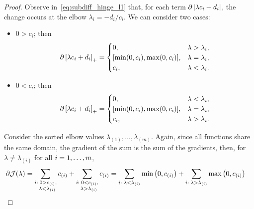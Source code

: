 \begin{proof}
    Observe in~\eqref{eq:subdiff_hinge_l1} that, for each term $\partial \left|\lambda c_i + d_i\right|$, the change occurs at the elbow $\lambda_{i} = - d_ i / c_i$. We can consider two cases:
    \begin{itemize}
        \item $0 > c_i$; then
        \begin{equation}
            \nonumber
            \begin{aligned}
                \partial \left[\lambda c_i + d_i\right]_{+} = 
            \begin{cases}
                0 ,& \lambda > \lambda_i, \\
                [\min(0, c_i), \max(0, c_i)] ,& \lambda = \lambda_i, \\
                {c_i} ,& \lambda < \lambda_i .\\
            \end{cases}
            \end{aligned}
        \end{equation}
        \item $0 < c_i$; then
        \begin{equation}
            \nonumber
            \begin{aligned}
                \partial \left[\lambda c_i + d_i\right]_{+} = 
            \begin{cases}
                0 ,& \lambda < \lambda_i, \\
                [\min(0, c_i), \max(0, c_i)] ,& \lambda = \lambda_i, \\
                {c_i} ,& \lambda > \lambda_i .\\
            \end{cases}
            \end{aligned}
        \end{equation}
    \end{itemize}
    Consider the sorted elbow values $\lambda_{(1)}, \ldots, \lambda_{(m)}$.
    Again, since all functions share the same domain, the gradient of the sum is the sum of the gradients, then, for $\lambda \neq \lambda_{(i)}$ for all $i=1,\ldots,m$,
    \begin{equation}\nonumber
        \begin{aligned}
            \partial \mathcal{J}(\lambda) &=  \sum_{\substack{i:\; 0 > c_{(i)},\\ \;\; \lambda < \lambda_{(i)}}} {c_{(i)}} + \sum_{\substack{i:\; 0 < c_{(i)},\\ \;\; \lambda > \lambda_{(i)}}} {c_{(i)}}  = \sum_{i: \; \lambda < \lambda_{(i)}} \mymin{0, c_{(i)}} + \sum_{i: \; \lambda > \lambda_{(i)}} \mymax{0, c_{(i)}}

\end{aligned}
\end{equation}
\end{proof}
